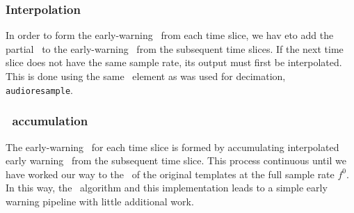 \subsubsection{Interpolation}

In order to form the early-warning \SNR\ from each time slice, we hav eto add the partial 
\SNR\ to the early-warning \SNR\ from the subsequent time slices.  If the next time slice 
does not have the same sample rate, its output must first be interpolated.  This is done
using the same \gstreamer\ element as was used for decimation, {\tt
audioresample}.  

\subsubsection{\SNR\ accumulation}

The early-warning \SNR\ for each time slice is formed by accumulating interpolated early
warning \SNR\ from the subsequent time slice.  This process continuous until we have 
worked our way to the \SNR\ of the original templates at the full sample rate $f^0$.  In 
this way, the \lloid\ algorithm and this implementation leads to a simple early warning
pipeline with little additional work.
